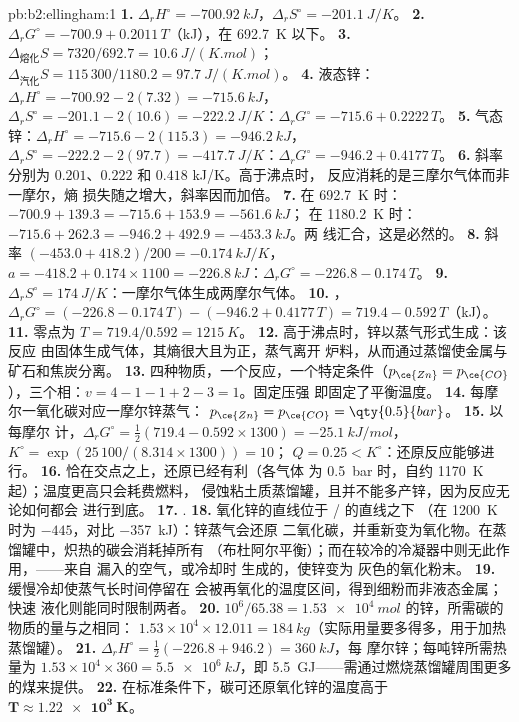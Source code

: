 \begin{solution}{pb:b2:ellingham:1}
\textbf{1.} $\Delta_r H^\circ = \qty{-700.92}{kJ}$，$\Delta_r S^\circ =
\qty{-201.1}{J/K}$。
\textbf{2.} $\Delta_r G^\circ = -700.9 + 0.2011\,T$（\unit{kJ}），在
\qty{692.7}{K} 以下。
\textbf{3.} $\Delta_{\text{熔化}}S = 7320/692.7 = \qty{10.6}{J/(K.mol)}$；
$\Delta_{\text{汽化}}S = 115\,300/1180.2 = \qty{97.7}{J/(K.mol)}$。
\textbf{4.} 液态锌：$\Delta_r H^\circ = -700.92 - 2(7.32) = \qty{-715.6}{kJ}$，
$\Delta_r S^\circ = -201.1 - 2(10.6) = \qty{-222.2}{J/K}$：$\Delta_r G^\circ =
-715.6 + 0.2222\,T$。
\textbf{5.} 气态锌：$\Delta_r H^\circ = -715.6 - 2(115.3) = \qty{-946.2}{kJ}$，
$\Delta_r S^\circ = -222.2 - 2(97.7) = \qty{-417.7}{J/K}$：$\Delta_r G^\circ =
-946.2 + 0.4177\,T$。
\textbf{6.} 斜率分别为 $0.201$、$0.222$ 和 $0.418$ \unit{kJ/K}。高于沸点时，
反应消耗的是三摩尔气体而非一摩尔，熵
损失随之增大，斜率因而加倍。
\textbf{7.} 在 \qty{692.7}{K} 时：$-700.9 + 139.3 = -715.6 + 153.9 = \qty{-561.6}{kJ}$；
在 \qty{1180.2}{K} 时：$-715.6 + 262.3 = -946.2 + 492.9 = \qty{-453.3}{kJ}$。两
线汇合，这是必然的。
\textbf{8.} 斜率 $(-453.0 + 418.2)/200 = \qty{-0.174}{kJ/K}$，$a = -418.2 +
0.174 \times 1100 = \qty{-226.8}{kJ}$：$\Delta_r G^\circ = -226.8 - 0.174\,T$。
\textbf{9.} $\Delta_r S^\circ = \qty{+174}{J/K}$：一摩尔气体生成两摩尔气体。
\textbf{10.} ，$\Delta_r G^\circ = (-226.8 - 0.174\,T)
- (-946.2 + 0.4177\,T) = 719.4 - 0.592\,T$（\unit{kJ}）。
\textbf{11.} 零点为 $T = 719.4/0.592 = \qty{1215}{K}$。
\textbf{12.} 高于沸点时，锌以蒸气形式生成：该反应
由固体生成气体，其熵很大且为正，蒸气离开
炉料，从而通过蒸馏使金属与矿石和焦炭分离。
\textbf{13.} 四种物质，一个反应，一个特定条件（$p_{\ce{Zn}} =
p_{\ce{CO}}$），三个相：$v = 4 - 1 - 1 + 2 - 3 = 1$。固定压强
即固定了平衡温度。
\textbf{14.} 每摩尔一氧化碳对应一摩尔锌蒸气：
$p_{\ce{Zn}} = p_{\ce{CO}} = \qty{0.5}{bar}$。
\textbf{15.} 以每摩尔  计，$\Delta_r G^\circ = \frac12(719.4 - 0.592 \times
1300) = \qty{-25.1}{kJ/mol}$，$K^\circ = \exp(25\,100/(8.314 \times 1300)) = 10$；
$Q = 0.25 < K^\circ$：还原反应能够进行。
\textbf{16.} 恰在交点之上，还原已经有利（各气体
为 \qty{0.5}{bar} 时，自约 \qty{1170}{K} 起）；温度更高只会耗费燃料，
侵蚀粘土质蒸馏罐，且并不能多产锌，因为反应无论如何都会
进行到底。
\textbf{17.} .
\textbf{18.} 氧化锌的直线位于 / 的直线之下
（在 \qty{1200}{K} 时为 $-445$，对比 \qty{-357}{kJ}）：锌蒸气会还原
二氧化碳，并重新变为氧化物。在蒸馏罐中，炽热的碳会消耗掉所有
（布杜阿尔平衡）；而在较冷的冷凝器中则无此作用，——来自
漏入的空气，或冷却时  生成的，使锌变为
灰色的氧化粉末。
\textbf{19.} 缓慢冷却使蒸气长时间停留在
会被再氧化的温度区间，得到细粉而非液态金属；快速
液化则能同时限制两者。
\textbf{20.} $10^6/65.38 = \qty{1.53e4}{mol}$ 的锌，所需碳的物质的量与之相同：
$1.53 \times 10^4 \times 12.011 = \qty{184}{kg}$（实际用量要多得多，用于加热
蒸馏罐）。
\textbf{21.} $\Delta_r H^\circ = \frac12(-226.8 + 946.2) = \qty{+360}{kJ}$，每
摩尔锌；每吨锌所需热量为 $1.53 \times 10^4 \times 360 = \qty{5.5e6}{kJ}$，即
\qty{5.5}{GJ}——需通过燃烧蒸馏罐周围更多的煤来提供。
\textbf{22.} 在标准条件下，碳可还原氧化锌的温度高于
$\boldsymbol{T \approx \qty{1.22e3}{K}}$。
\end{solution}
